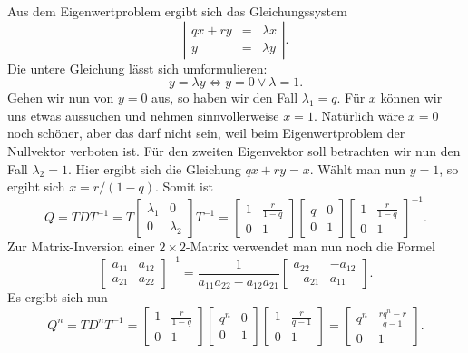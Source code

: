 \documentclass[a4paper,12pt,fleqn,twoside]{article}
\numberwithin{equation}{section}
\theoremstyle{definition}
\begin{document}
Aus dem Eigenwertproblem ergibt sich das Gleichungssystem
\[\left|
\begin{array}{rcl}
qx+ry &=& \lambda x\\
y &=& \lambda y
\end{array}\right|.\]
Die untere Gleichung lässt sich umformulieren:
\[y=\lambda y \iff y=0\lor \lambda=1.\]
Gehen wir nun von $y=0$ aus, so haben wir den Fall $\lambda_1=q$.
Für $x$ können wir uns etwas aussuchen und nehmen sinnvollerweise
$x=1$. Natürlich wäre $x=0$ noch schöner, aber das darf nicht sein,
weil beim Eigenwertproblem der Nullvektor verboten ist. Für
den zweiten Eigenvektor soll betrachten wir nun den Fall $\lambda_2=1$.
Hier ergibt sich die Gleichung $qx+ry=x$. Wählt man nun $y=1$, so
ergibt sich $x=r/(1-q)$. Somit ist
\[
Q = TDT^{-1}
= T\begin{bmatrix}
\lambda_1 & 0\\
0 & \lambda_2
\end{bmatrix}T^{-1}
= \begin{bmatrix}
1 & \frac{r}{1-q}\\
0 & 1
\end{bmatrix}\begin{bmatrix}
q & 0\\
0 & 1
\end{bmatrix}\begin{bmatrix}
1 & \frac{r}{1-q}\\
0 & 1
\end{bmatrix}^{-1}.
\]
Zur Matrix-Inversion einer $2{\times}2$-Matrix verwendet man nun noch
die Formel
\[
\begin{bmatrix}
a_{11} & a_{12}\\
a_{21} & a_{22}
\end{bmatrix}^{-1}
= \frac{1}{a_{11}a_{22}-a_{12}a_{21}}
\begin{bmatrix}
a_{22} & -a_{12}\\
-a_{21} & a_{11}
\end{bmatrix}.
\]
Es ergibt sich nun
\[Q^n = TD^nT^{-1}
= \begin{bmatrix}
1 & \frac{r}{1-q}\\
0 & 1
\end{bmatrix}\begin{bmatrix}
q^n & 0\\
0 & 1
\end{bmatrix}\begin{bmatrix}
1 & \frac{r}{q-1}\\
0 & 1
\end{bmatrix}
= \begin{bmatrix}
q^n & \frac{rq^n-r}{q-1}\\
0 & 1
\end{bmatrix}.
\]
\end{document}

